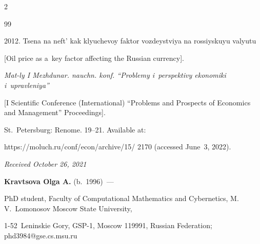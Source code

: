 \begin{multicols}{2}
{{\begin{thebibliography}{99}

 2012. Tsena na neft' kak klyuchevoy faktor vozdeystviya na rossiyskuyu valyutu 

[Oil price as a~key factor affecting the Russian currency]. 

\textit{Mat-ly I Mezhdunar. nauchn. konf. ``Problemy i~perspektivy ekonomiki i~upravleniya''}

 [I Scientific Conference (International) ``Problems and Prospects of Economics and Management'' Proceedings]. 

 St.\ Petersburg: Renome. 19--21. Available at: 

 {\sf  https://moluch.ru/conf/econ/archive/15/ 2170} (accessed June~3, 2022).

 \end{thebibliography}



 }

 }



\end{multicols}



\vspace*{-6pt}



\hfill{\small\textit{Received October 26, 2021}}



\Contrl



\noindent

\textbf{Kravtsova Olga A.} (b.\ 1996)~--- 

PhD student, Faculty of Computational Mathematics and Cybernetics, M.\,V.~Lomonosov Moscow State University, 

1-52~Leninskie Gory, GSP-1, Moscow 119991, Russian Federation; \mbox{phd3984@gse.cs.msu.ru}







   



\label{end\stat}



\renewcommand{\bibname}{\protect\rm Литература}    

